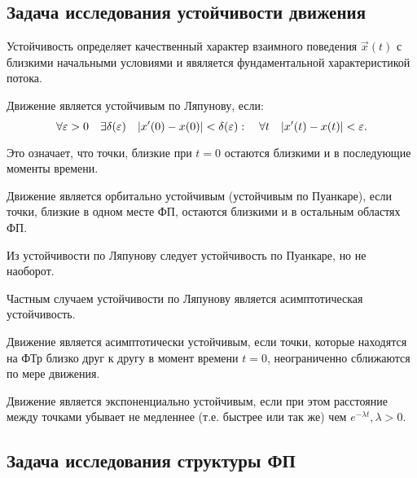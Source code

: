 \subsection{Задача исследования устойчивости движения}

Устойчивость определяет качественный характер взаимного поведения $\vec{x}(t)$ с близкими начальными условиями и явяляется фундаментальной характеристикой потока.

\begin{definition}
	Движение является устойчивым по Ляпунову, если:
	$$\forall \varepsilon>0 \quad \exists \delta(\varepsilon) \quad \lvert x^{\prime}(0)-x(0)\rvert<\delta(\varepsilon): \quad \forall t \quad  \lvert x^{\prime}(t)-x(t)\rvert<\varepsilon.$$
	
	Это означает, что точки, близкие при $t=0$ остаются близкими и в последующие моменты времени.
\end{definition}

\begin{definition}
	Движение является орбитально устойчивым (устойчивым по Пуанкаре), если точки, близкие в одном месте ФП, остаются близкими и в остальным областях ФП.
\end{definition}

\begin{remark}
	Из устойчивости по Ляпунову следует устойчивость по Пуанкаре, но не наоборот.
\end{remark}

Частным случаем устойчивости по Ляпунову является асимптотическая устойчивость.

\begin{definition}
	Движение является асимптотически устойчивым, если точки, которые находятся на ФТр близко друг к другу в момент времени $t=0$, неограниченно сближаются по мере движения.
\end{definition}

\begin{definition}
		Движение является экспоненциально устойчивым, если при этом расстояние между точками убывает не медленнее (т.е. быстрее или так же) чем $e^{-\lambda t}, \lambda>0$.
\end{definition}
 
\subsection{Задача исследования структуры ФП}


